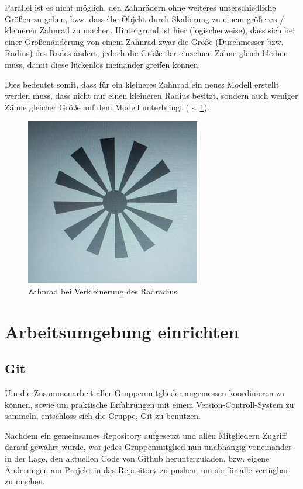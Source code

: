 \documentclass{article}
\begin{document}
Parallel ist es nicht möglich, den Zahnrädern ohne weiteres unterschiedliche Größen zu geben, bzw. dasselbe Objekt durch Skalierung zu einem größeren / kleineren Zahnrad zu machen. 
Hintergrund ist hier (logischerweise), dass sich bei einer Größenänderung von einem Zahnrad zwar die Größe (Durchmesser bzw. Radius) des Rades ändert, jedoch die Größe der einzelnen Zähne gleich bleiben muss, damit diese lückenlos ineinander greifen können. 

Dies bedeutet somit, dass für ein kleineres Zahnrad ein neues Modell erstellt werden muss, dass nicht nur einen kleineren Radius besitzt, sondern auch weniger Zähne gleicher Größe auf dem Modell unterbringt ( s. \ref{fig:littleGear}). 

\begin{figure}
\centering
\includegraphics[scale=1.7]{res/Little_Gear.png}
\caption{Zahnrad bei Verkleinerung des Radradius}
\label{fig:littleGear}
\end{figure}



\section{Arbeitsumgebung einrichten}



\subsection{Git}
Um die Zusammenarbeit aller Gruppenmitglieder angemessen koordinieren zu können, sowie um praktische Erfahrungen mit einem Version-Controll-System zu sammeln, entschloss sich die Gruppe, Git zu benutzen. 

Nachdem ein gemeinsames Repository aufgesetzt und allen Mitgliedern Zugriff darauf gewährt wurde, war jedes Gruppenmitglied nun unabhängig voneinander in der Lage, den aktuellen Code von Github herunterzuladen, bzw. eigene Änderungen am Projekt in das Repository zu pushen, um sie für alle verfügbar zu machen. 
\end{document}
